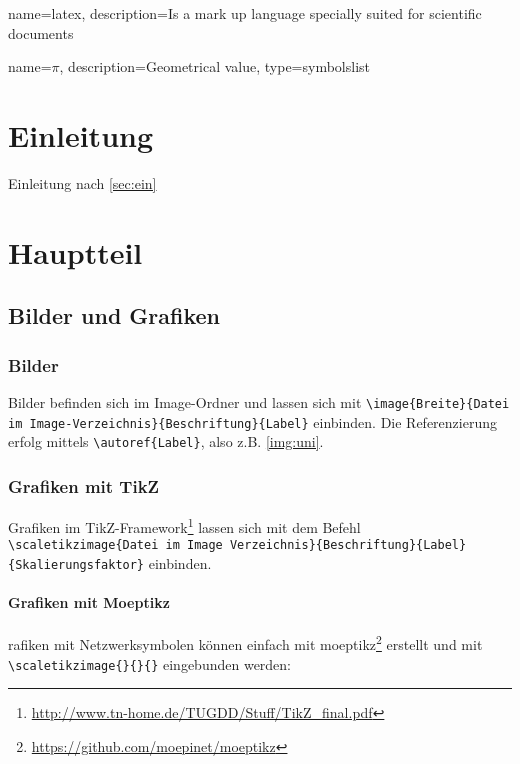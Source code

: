 
{
        name=latex,
        description={Is a mark up language specially suited for scientific documents}
}

{
        name=\ensuremath{\pi},
        description={Geometrical value},
        type=symbolslist
}

\lstset{language=TeX}

\section{Einleitung}\label{sec:ein}
Einleitung nach \autoref{sec:ein}

\section{Hauptteil}\label{sec:haupt}
\subsection{Bilder und Grafiken}\label{subsec:grafiken}

\subsubsection{Bilder}\label{subsubsec:bilder}
Bilder befinden sich im Image-Ordner und lassen sich mit \lstinline|\image{Breite}{Datei im Image-Verzeichnis}{Beschriftung}{Label}| einbinden.  Die Referenzierung erfolg mittels \lstinline|\autoref{Label}|, also z.B. \autoref{img:uni}.

\subsubsection{Grafiken mit TikZ}
Grafiken im TikZ-Framework\footnote{\url{http://www.tn-home.de/TUGDD/Stuff/TikZ_final.pdf}} lassen sich mit dem Befehl \lstinline|\scaletikzimage{Datei im Image Verzeichnis}{Beschriftung}{Label}{Skalierungsfaktor}| einbinden. 

\paragraph{Grafiken mit Moeptikz}

rafiken mit Netzwerksymbolen können einfach mit moeptikz\footnote{\url{https://github.com/moepinet/moeptikz}} erstellt und mit \lstinline|\scaletikzimage{}{}{}| eingebunden werden:

